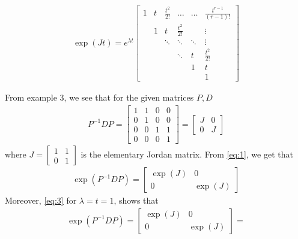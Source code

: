 \documentclass[12pt]{exam}
\theoremstyle{plain} %
\theoremstyle{definition} %
\theoremstyle{remark} %
\begin{document}
\begin{questions}
\begin{solution}
\begin{align}
      \label{eq:3}
      \exp(Jt) =
      e^{\lambda t}
      \begin{bmatrix}%
        1 & t & \frac{t^2}{2!} & \ldots & \ldots &  \frac{t^{r-1}}{(r-1)!} \\
        & 1 & t &\frac{t^2}{2!}  & & \vdots \\
        & & \ddots & \ddots & \ddots & \vdots \\
        & & & \ddots & t & \frac{t^2}{2!} \\
        & & & & 1 & t \\
        & & & & & 1
      \end{bmatrix}
    \end{align}
  \end{solution}

  \question
  \begin{solution}
    From example 3, we see that for the given matrices $P, D$
    \begin{align*}
      P^{-1}DP =
      \begin{bmatrix}%
        1 & 1 & 0 & 0\\
        0 & 1 & 0 & 0\\
        0 & 0 & 1 & 1\\
        0 & 0 & 0 & 1
      \end{bmatrix} =
      \begin{bmatrix}%
        J & 0\\
        0 & J
      \end{bmatrix}
    \end{align*}
    where $J =
    \begin{bmatrix}%
      1 & 1\\
      0 & 1
    \end{bmatrix}$ is the elementary Jordan matrix. From
    \autoref{eq:1}, we get that
    \begin{align*}
      \exp(P^{-1}DP) =
      \begin{bmatrix}%
        \exp(J) & 0\\
        0 & \exp(J)
      \end{bmatrix}
    \end{align*}
    Moreover, \autoref{eq:3} for $\lambda = t = 1$, shows that
    \begin{align*}
      \exp(P^{-1}DP) =
      \begin{bmatrix}%
        \exp(J) & 0\\
        0 & \exp(J)
      \end{bmatrix} =

\end{align*}
\end{solution}
\end{questions}
\end{document}

